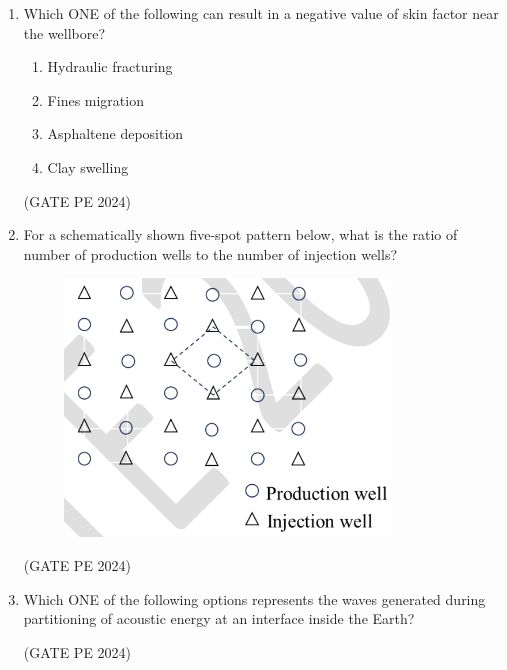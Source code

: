 \documentclass[journal,12pt,onecolumn]{IEEEtran}
\theoremstyle{remark}
\begin{document}
\begin{enumerate}
\item Which ONE of the following can result in a negative value of skin factor near the wellbore?
\begin{enumerate}
    \item Hydraulic fracturing
    \item Fines migration
    \item Asphaltene deposition
    \item Clay swelling
\end{enumerate}
\hfill{(GATE PE 2024)}

\item For a schematically shown five-spot pattern below, what is the ratio of number of production wells to the number of injection wells?
\begin{figure}[H]
    \centering
    \includegraphics[width=0.5\columnwidth]{LQ_22.png}
    \caption{}
    \label{fig:placeholder}
\end{figure}
\begin{enumerate}
\end{enumerate}
\hfill{(GATE PE 2024)}

\item Which ONE of the following options represents the waves generated during partitioning of acoustic energy at an interface inside the Earth?
\begin{enumerate}
\end{enumerate}
\hfill{(GATE PE 2024)}


\end{enumerate}
\end{document}
